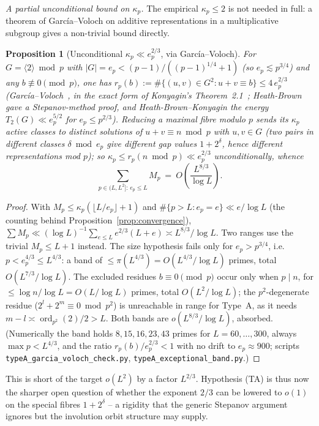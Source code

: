 \documentclass[11pt]{article}
\theoremstyle{plain}
\newtheorem{proposition}[theorem]{Proposition}
\theoremstyle{definition}
\theoremstyle{remark}
\newcommand{\ord}{\operatorname{ord}}
\newcommand{\ep}{e_p}
\begin{document}
\emph{A partial unconditional bound on $\kappa_p$.} The empirical $\kappa_p\le2$
is not needed in full: a theorem of García--Voloch on additive representations in
a multiplicative subgroup gives a non-trivial bound directly.

\begin{proposition}[Unconditional $\kappa_p\ll\ep^{2/3}$, via García--Voloch]\label{prop:gv}
For $G=\langle2\rangle\bmod p$ with $|G|=\ep<(p-1)/((p-1)^{1/4}+1)$ (so $\ep\lesssim
p^{3/4}$) and any $b\not\equiv0\pmod p$, one has $r_p(b):=\#\{(u,v)\in G^2:u+v\equiv b\}
\le4\,\ep^{2/3}$ \textup{(}García--Voloch~\cite{GarciaVoloch1988}, in the exact
form of Konyagin's Theorem~2.1~\cite{Konyagin-notes}; Heath-Brown gave a
Stepanov-method proof, and Heath-Brown--Konyagin the energy $T_2(G)\ll\ep^{5/2}$ for
$\ep\le p^{2/3}$\textup{)}. Reducing a maximal fibre modulo $p$ sends its $\kappa_p$
active classes to distinct solutions of $u+v\equiv n\bmod p$ with $u,v\in G$ (two
pairs in different classes $\delta\bmod\ep$ give different gap values $1+2^\delta$,
hence different representations mod $p$); so $\kappa_p\le r_p(n\bmod p)\ll\ep^{2/3}$
unconditionally, whence
\[
\sum_{p\in(L,L^2]:\,\ep\le L}M_p\ =\ O\!\left(\frac{L^{8/3}}{\log L}\right).
\]
\end{proposition}
\begin{proof}
With $M_p\le\kappa_p(\lfloor L/\ep\rfloor+1)$ and $\#\{p>L:\ep=e\}\ll e/\log L$
(the counting behind Proposition~\ref{prop:convergence}),
$\sum M_p\ll(\log L)^{-1}\sum_{e\le L}e^{2/3}(L+e)\asymp L^{8/3}/\log L$. Two ranges
use the trivial $M_p\le L+1$ instead. The size hypothesis fails only for $\ep>p^{3/4}$,
i.e.\ $p<\ep^{4/3}\le L^{4/3}$: a band of $\le\pi(L^{4/3})=O(L^{4/3}/\log L)$ primes,
total $O(L^{7/3}/\log L)$. The excluded residues $b\equiv0\pmod p$ occur only when
$p\mid n$, for $\le\log n/\log L=O(L/\log L)$ primes, total $O(L^2/\log L)$; the
$p^2$-degenerate residue ($2^l+2^m\equiv0\bmod p^2$) is unreachable in range for
Type~A, as it needs $m-l\asymp\ord_{p^2}(2)/2>L$. Both bands are $o(L^{8/3}/\log L)$,
absorbed. \textup{(}Numerically the band holds $8,15,16,23,43$ primes for
$L=60,\dots,300$, always $\max p<L^{4/3}$, and the ratio $r_p(b)/\ep^{2/3}<1$ with no
drift to $\ep\approx900$; scripts \texttt{typeA\_garcia\_voloch\_check.py},
\texttt{typeA\_exceptional\_band.py}.\textup{)}
\end{proof}

This is short of the target $o(L^2)$ by a factor $L^{2/3}$. Hypothesis (TA) is thus
now the sharper open question of whether the exponent $2/3$ can be lowered to $o(1)$
on the special fibres $1+2^\delta$ -- a rigidity that the generic Stepanov argument
ignores but the involution orbit structure may supply.
\end{document}

